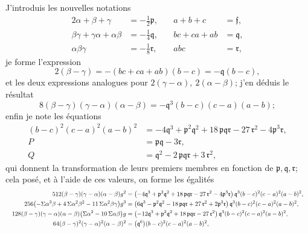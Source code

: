 \documentclass[11pt]{article}
\begin{document}
J'introduis les nouvelles notations
\begin{alignat*}{2}
\alpha + \beta + \gamma &= -\tfrac{1}{2} \mathfrak{p}, & \quad a + b + c &= \mathfrak{f}, \\
\beta\gamma + \gamma\alpha + \alpha\beta &= -\tfrac{1}{4} \mathfrak{q}, & \quad bc + ca + ab &= \mathfrak{q}, \\
\alpha\beta\gamma &= -\tfrac{1}{8} \mathfrak{r}, & \quad abc &= \mathfrak{r},
\end{alignat*}
je forme l'expression
\[
2(\beta - \gamma) = -(bc + ca + ab)(b - c) = -\mathfrak{q}(b - c),
\]
et les deux expressions analogues pour $2(\gamma - \alpha),\ 2(\alpha - \beta)$; j'en d\'eduis le r\'esultat
\[
8(\beta - \gamma)(\gamma - \alpha)(\alpha - \beta) = -\mathfrak{q}^{3}(b - c)(c - a)(a - b);
\]
enfin je note les \'equations
\begin{align*}
(b - c)^{2}(c - a)^{2}(a - b)^{2} &= -4 \mathfrak{q}^{3} + \mathfrak{p}^{2}\mathfrak{q}^{2} + 18\,\mathfrak{p}\mathfrak{q}\mathfrak{r} - 27\,\mathfrak{r}^{2} - 4 \mathfrak{p}^{3}\mathfrak{r}, \\
P &= \mathfrak{p}\mathfrak{q} - 3\mathfrak{r}, \\
Q &= \mathfrak{q}^{2} - 2\,\mathfrak{p}\mathfrak{q}\mathfrak{r} + 3\,\mathfrak{r}^{2},
\end{align*}
qui donnent la transformation de leurs premiers membres en fonction de $\mathfrak{p}, \mathfrak{q}, \mathfrak{r}$; cela pos\'e, et \`a l'aide de ces valeurs, on forme les \'egalit\'es
\[
\resizebox{\textwidth}{!}{$\displaystyle
\begin{aligned}
512(\beta - \gamma)(\gamma - \alpha)(\alpha - \beta) g^{2} &= \bigl(-4\mathfrak{q}^{3} + \mathfrak{p}^{2}\mathfrak{q}^{2} + 18\,\mathfrak{p}\mathfrak{q}\mathfrak{r} - 27\,\mathfrak{r}^{2} - 4 \mathfrak{p}^{3}\mathfrak{r}\bigr)\,\mathfrak{q}^{3}(b - c)^{2}(c - a)^{2}(a - b)^{2}, \\
256\bigl(-\Sigma \alpha^{3}\beta + 4\,\Sigma \alpha^{2}\beta^{2} - 11\,\Sigma \alpha^{2}\beta\gamma\bigr) g^{3} &= \bigl(6\mathfrak{q}^{3} - \mathfrak{p}^{2}\mathfrak{q}^{2} - 18\,\mathfrak{p}\mathfrak{q}\mathfrak{r} + 27\,\mathfrak{r}^{2} + 2 \mathfrak{p}^{3}\mathfrak{r}\bigr)\,\mathfrak{q}^{3}(b - c)^{2}(c - a)^{2}(a - b)^{2}, \\
128(\beta - \gamma)(\gamma - \alpha)(\alpha - \beta)\bigl(\Sigma \alpha^{2} - 10\,\Sigma \alpha\beta\bigr) g &= \bigl(-12\mathfrak{q}^{3} + \mathfrak{p}^{2}\mathfrak{q}^{2} + 18\,\mathfrak{p}\mathfrak{q}\mathfrak{r} - 27\,\mathfrak{r}^{2}\bigr)\,\mathfrak{q}^{3}(b - c)^{2}(c - a)^{2}(a - b)^{2}, \\
64(\beta - \gamma)^{2}(\gamma - \alpha)^{2}(\alpha - \beta)^{2} &= \bigl(\mathfrak{q}^{6}\bigr)(b - c)^{2}(c - a)^{2}(a - b)^{2},
\end{aligned}$}
\]
\end{document}
